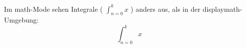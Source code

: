\documentclass{article}
\begin{document}
  Im math-Mode sehen Integrale (
  $ \int_{n=0}^{k} x $
  ) anders aus, als in der displaymath-Umgebung:
  \begin{displaymath}
    \int_{n=0}^{k} x
  \end{displaymath}
\end{document}
